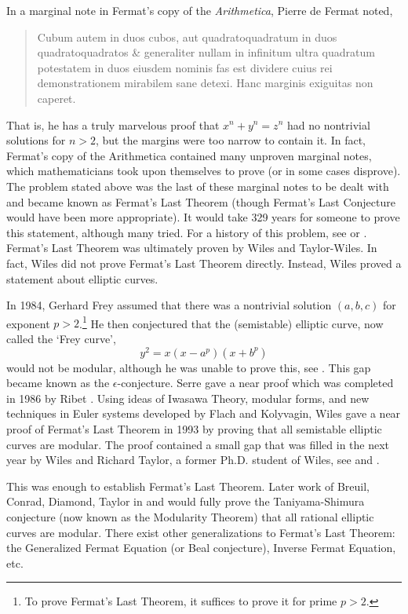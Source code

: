 \begin{ex}
In a marginal note in Fermat's copy of the {\itshape Arithmetica}, Pierre de Fermat noted, 
	\begin{quote}
	Cubum autem in duos cubos, aut quadratoquadratum in duos quadratoquadratos \& generaliter nullam in infinitum ultra quadratum potestatem in duos eiusdem nominis fas est dividere cuius rei demonstrationem mirabilem sane detexi. Hanc marginis exiguitas non caperet.
	\end{quote}
That is, he has a truly marvelous proof that $x^n + y^n= z^n$ had no nontrivial solutions for $n > 2$, but the margins were too narrow to contain it. In fact, Fermat's copy of the Arithmetica contained many unproven marginal notes, which mathematicians took upon themselves to prove (or in some cases disprove). The problem stated above was the last of these marginal notes to be dealt with and became known as Fermat's Last Theorem (though Fermat's Last Conjecture would have been more appropriate). It would take 329 years for someone to prove this statement, although many tried. For a history of this problem, see \cite{singh12} or \cite{ribet95}. Fermat's Last Theorem was ultimately proven by Wiles and Taylor-Wiles. In fact, Wiles did not prove Fermat's Last Theorem directly. Instead, Wiles proved a statement about elliptic curves. 

In 1984, Gerhard Frey assumed that there was a nontrivial solution $(a,b,c)$ for exponent $p > 2$.\footnote{To prove Fermat's Last Theorem, it suffices to prove it for prime $p > 2$.} He then conjectured that the (semistable) elliptic curve, now called the `Frey curve',
	\[
	y^2= x ( x - a^p)(x + b^p)
	\]
would not be modular, although he was unable to prove this, see \cite{frey86}. This gap became known as the $\epsilon$-conjecture. Serre gave a near proof which was completed in 1986 by Ribet \cite{ribet90}. Using ideas of Iwasawa Theory, modular forms, and new techniques in Euler systems developed by Flach and Kolyvagin, Wiles gave a near proof of Fermat's Last Theorem in 1993 by proving that all semistable elliptic curves are modular. The proof contained a small gap that was filled in the next year by Wiles and Richard Taylor, a former Ph.D. student of Wiles, see \cite{wiles95} and \cite{taylorwiles95}.

This was enough to establish Fermat's Last Theorem. Later work of Breuil, Conrad, Diamond, Taylor in \cite{conraddiamondtaylor99} and \cite{breuilconraddiamondtaylor01} would fully prove the Taniyama-Shimura conjecture (now known as the Modularity Theorem) that all rational elliptic curves are modular. There exist other generalizations to Fermat's Last Theorem: the Generalized Fermat Equation (or Beal conjecture), Inverse Fermat Equation, etc. 
\end{ex}


